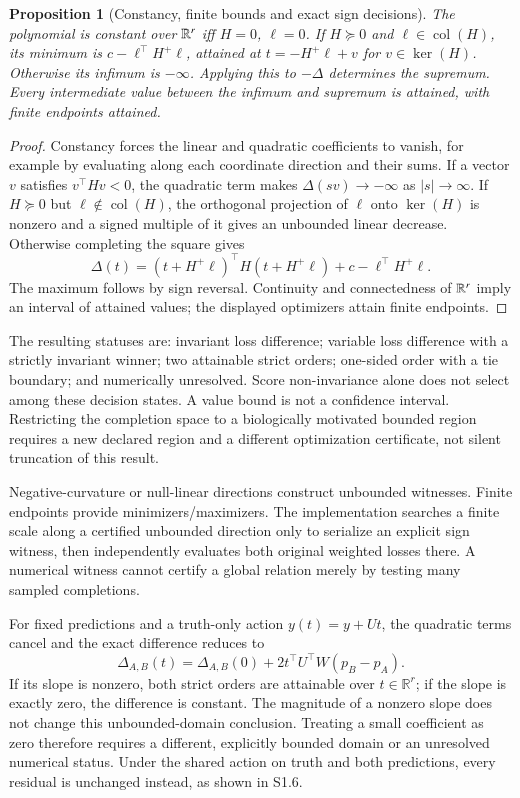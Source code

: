 \documentclass[11pt]{article}
\newtheorem{proposition}{Proposition}
\begin{document}
\begin{proposition}[Constancy, finite bounds and exact sign decisions]
The polynomial is constant over $\mathbb{R}^r$ iff $H=0$, $\ell=0$. If $H\succeq0$ and $\ell\in\operatorname{col}(H)$, its minimum is $c-\ell^\top H^+\ell$, attained at $t=-H^+\ell+v$ for $v\in\ker(H)$. Otherwise its infimum is $-\infty$. Applying this to $-\Delta$ determines the supremum. Every intermediate value between the infimum and supremum is attained, with finite endpoints attained.
\end{proposition}
\begin{proof}
Constancy forces the linear and quadratic coefficients to vanish, for example by evaluating along each coordinate direction and their sums. If a vector $v$ satisfies $v^\top Hv<0$, the quadratic term makes $\Delta(sv)\to-\infty$ as $|s|\to\infty$. If $H\succeq0$ but $\ell\notin\operatorname{col}(H)$, the orthogonal projection of $\ell$ onto $\ker(H)$ is nonzero and a signed multiple of it gives an unbounded linear decrease. Otherwise completing the square gives
\[
\Delta(t)=(t+H^+\ell)^\top H(t+H^+\ell)+c-\ell^\top H^+\ell.
\]
The maximum follows by sign reversal. Continuity and connectedness of $\mathbb{R}^r$ imply an interval of attained values; the displayed optimizers attain finite endpoints.
\end{proof}
The resulting statuses are: invariant loss difference; variable loss difference with a strictly invariant winner; two attainable strict orders; one-sided order with a tie boundary; and numerically unresolved. Score non-invariance alone does not select among these decision states. A value bound is not a confidence interval. Restricting the completion space to a biologically motivated bounded region requires a new declared region and a different optimization certificate, not silent truncation of this result.

Negative-curvature or null-linear directions construct unbounded witnesses. Finite endpoints provide minimizers/maximizers. The implementation searches a finite scale along a certified unbounded direction only to serialize an explicit sign witness, then independently evaluates both original weighted losses there. A numerical witness cannot certify a global relation merely by testing many sampled completions.

For fixed predictions and a truth-only action $y(t)=y+Ut$, the quadratic terms cancel and the exact difference reduces to
\[
\Delta_{A,B}(t)=\Delta_{A,B}(0)+2t^\top U^\top W(p_B-p_A).
\]
If its slope is nonzero, both strict orders are attainable over $t\in\mathbb R^r$; if the slope is exactly zero, the difference is constant. The magnitude of a nonzero slope does not change this unbounded-domain conclusion. Treating a small coefficient as zero therefore requires a different, explicitly bounded domain or an unresolved numerical status. Under the shared action on truth and both predictions, every residual is unchanged instead, as shown in S1.6.
\end{document}
